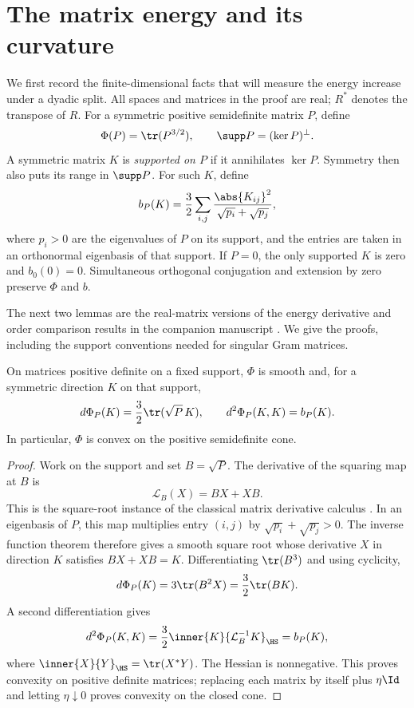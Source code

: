 \section{The matrix energy and its curvature}\label{sec:matrix}

We first record the finite-dimensional facts that will measure the
energy increase under a dyadic split. All spaces and matrices in the
proof are real; \(R^*\) denotes the transpose of \(R\).
For a symmetric positive semidefinite matrix \(P\), define
\[
 \Phi(P)=\tr(P^{3/2}),\qquad \supp P=(\ker P)^\perp.
\]
A symmetric matrix \(K\) is \emph{supported on \(P\)} if it annihilates
\(\ker P\). Symmetry then also puts its range in \(\supp P\).
For such \(K\), define
\begin{equation}\label{eq:hessian}
 b_P(K)=\frac32\sum_{i,j}
          \frac{\abs{K_{ij}}^2}{\sqrt{p_i}+\sqrt{p_j}},
\end{equation}
where \(p_i>0\) are the eigenvalues of \(P\) on its support, and the
entries are taken in an orthonormal eigenbasis of that support.
If \(P=0\), the only supported \(K\) is zero and \(b_0(0)=0\).
Simultaneous orthogonal conjugation and extension by zero preserve
\(\Phi\) and \(b\).

The next two lemmas are the real-matrix versions of the energy
derivative and order comparison results in the companion manuscript
\cite[Section~2]{OpenAI2026}. We give the proofs, including the support
conventions needed for singular Gram matrices.

\begin{lemma}\label{lem:hessian}
On matrices positive definite on a fixed support, \(\Phi\) is smooth
and, for a symmetric direction \(K\) on that support,
\[
 d\Phi_P(K)=\frac32\tr(\sqrt P\,K),
 \qquad d^2\Phi_P(K,K)=b_P(K).
\]
In particular, \(\Phi\) is convex on the positive semidefinite cone.
\end{lemma}

\begin{proof}
Work on the support and set \(B=\sqrt P\). The derivative of the
squaring map at \(B\) is
\[
 \mathcal L_B(X)=BX+XB.
\]
This is the square-root instance of the classical matrix derivative
calculus \cite[Section~1, Equation~(1)]{Daletskii1957}.
In an eigenbasis of \(P\), this map multiplies entry \((i,j)\) by
\(\sqrt{p_i}+\sqrt{p_j}>0\). The inverse function theorem therefore
gives a smooth square root whose derivative \(X\) in direction \(K\)
satisfies \(BX+XB=K\). Differentiating \(\tr(B^3)\) and using cyclicity,
\[
 d\Phi_P(K)=3\tr(B^2X)=\frac32\tr(BK).
\]
A second differentiation gives
\[
 d^2\Phi_P(K,K)
 =\frac32\inner{K}{\mathcal L_B^{-1}K}_{\HS}
 =b_P(K),
\]
where \(\inner{X}{Y}_{\HS}=\tr(X^*Y)\).
The Hessian is nonnegative. This proves convexity on positive
definite matrices; replacing each matrix by itself plus \(\eta\Id\)
and letting \(\eta\downarrow0\) proves convexity on the closed cone.
\end{proof}

